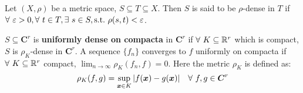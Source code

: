 \begin{df}
    Let $(X, \rho)$ be a metric space, $S \subseteq T \subseteq X$. Then $S$ is said to be $\rho$-dense in $T$ 
    if $\forall~ \varepsilon > 0, \forall~ t \in T, \exists~ s \in S, \text{s.t.\ } \rho(s, t) < \varepsilon$.
\end{df}

\begin{df}
    $S \subseteq \boldsymbol{C}^r$ is \textbf{uniformly dense on compacta} in $\boldsymbol{C}^r$ if $\forall~ K
    \subseteq \mathbb{R}^r$ which is compact, $S$ is $\rho_K$-dense in $\boldsymbol{C}^r$. A sequence 
    $\{f_n\}$ converges to $f$ uniformly on compacta if $\forall~ K \subseteq \mathbb{R}^r$ compact, 
    $\displaystyle\lim_{n\to\infty}\rho_K(f_n, f) = 0$. Here the metric 
    $\rho_K$ is defined as:
    $$\rho_K(f, g) = \sup_{\boldsymbol{x}\in K}|f(\boldsymbol{x}) - g(\boldsymbol{x})|\quad\forall~ f, g\in \boldsymbol{C}^r$$
\end{df}